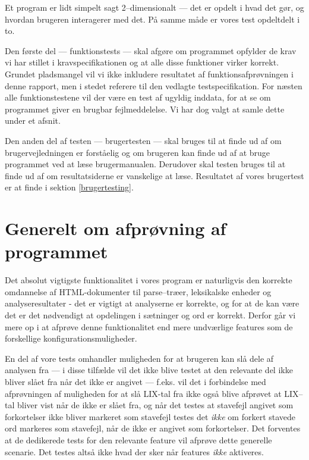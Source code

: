 \documentclass[a4paper,oneside]{memoir}
\begin{document}
Et program er lidt simpelt sagt 2--dimensionalt --- det er opdelt i
hvad det gør, og hvordan brugeren interagerer med det. På samme måde
er vores test opdeltdelt i to. 

Den første del --- funktionstests --- skal afgøre om programmet
opfylder de krav vi har stillet i kravspecifikationen og at alle disse
funktioner virker korrekt. Grundet pladsmangel vil vi ikke inkludere
resultatet af funktionsafprøvningen i denne rapport, men i stedet
referere til den vedlagte testspecifikation. For næsten alle
funktionstestene vil der være en test af ugyldig inddata, for at se om
programmet giver en brugbar fejlmeddelelse. Vi har dog valgt at samle
dette under et afsnit. 

Den anden del af testen --- brugertesten --- skal bruges til at finde
ud af om brugervejledningen er forståelig og om brugeren kan finde ud
af at bruge programmet ved at læse brugermanualen. Derudover skal
testen bruges til at finde ud af om resultatsiderne er vanskelige at
læse. Resultatet af vores brugertest er at finde i sektion
\ref{brugertesting}.

\section{Generelt om afprøvning af programmet}

Det absolut vigtigste funktionalitet i vores program er naturligvis
den korrekte omdannelse af HTML-dokumenter til parse--træer,
leksikalske enheder og analyseresultater - det er vigtigt at
analyserne er korrekte, og for at de kan være det er det nødvendigt at
opdelingen i sætninger og ord er korrekt. Derfor går vi mere op i at
afprøve denne funktionalitet end mere undværlige features som de
forskellige konfigurationsmuligheder.

En del af vore tests omhandler muligheden for at brugeren kan slå dele
af analysen fra --- i disse tilfælde vil det ikke blive testet at den
relevante del ikke bliver slået fra når det ikke er angivet ---
f.eks. vil det i forbindelse med afprøvningen af muligheden for at slå
LIX-tal fra ikke også blive afprøvet at LIX--tal bliver vist når de
ikke er slået fra, og når det testes at stavefejl angivet som
forkortelser ikke bliver markeret som stavefejl testes det
\textit{ikke} om forkert stavede ord markeres som stavefejl, når de
ikke er angivet som forkortelser. Det forventes at de dedikerede tests
for den relevante feature vil afprøve dette generelle scenarie. Det
testes altså ikke hvad der sker når features \textit{ikke} aktiveres.
\end{document}

